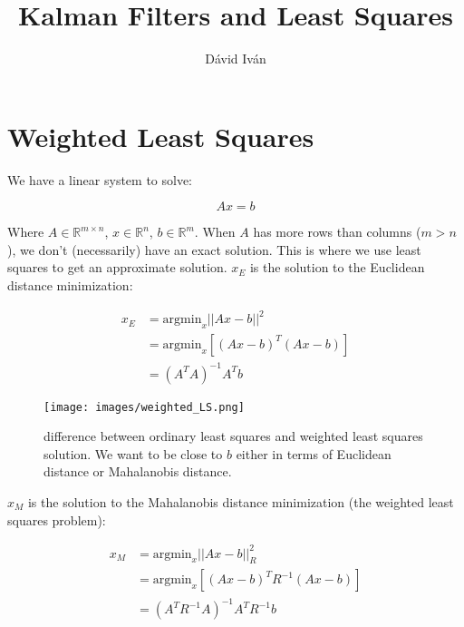 \documentclass{article}
\title{Kalman Filters and Least Squares}
\author{Dávid Iván}
\begin{document}
\maketitle

\tableofcontents

\newpage

\section{Weighted Least Squares}

We have a linear system to solve:

\begin{equation}
    Ax = b
\end{equation}

Where $A \in \mathbb{R}^{m \times n}$, $x \in \mathbb{R}^n$, $b \in \mathbb{R}^m$. When $A$ has more rows than columns ($m > n$), we don't (necessarily) have an exact solution. This is where we use least squares to get an approximate solution. $x_E$ is the solution to the Euclidean distance minimization:

\begin{equation}
\begin{split}
    x_E &= \text{argmin}_x || Ax-b ||^2\\
    &= \text{argmin}_x \left[ (Ax-b)^T (Ax-b) \right]\\
    &= (A^T A)^{-1}A^T b
\end{split}
\end{equation}

\begin{figure}[ht]
 \centering
  \texttt{[image: images/weighted\_LS.png]}
  \caption{difference between ordinary least squares and weighted least squares solution. We want to be close to $b$ either in terms of Euclidean distance or Mahalanobis distance.}
  \label{fig:EucMah}
\end{figure}


$x_M$ is the solution to the Mahalanobis distance minimization (the weighted least squares problem):

\begin{equation}
\begin{split}
    x_M &= \text{argmin}_x || Ax-b ||^2_R\\
    &= \text{argmin}_x \left[ (Ax-b)^T R^{-1} (Ax-b) \right]\\
    &= (A^T R^{-1} A)^{-1}A^T R^{-1} b
\end{split}
\end{equation}
\end{document}
